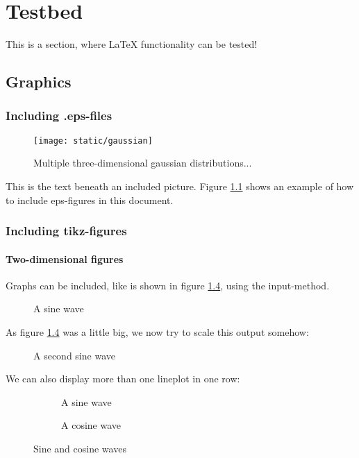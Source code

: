 \chapter[Testbed]{Testbed}
\label{chap:Testbed}
This is a section, where LaTeX functionality can be tested!
\section{Graphics}
\subsection{Including .eps-files}

\begin{figure}[H]
\centering
\texttt{[image: static/gaussian]}
\caption{Multiple three-dimensional gaussian distributions...}
\label{fig:mog}
\end{figure}


This is the text beneath an included picture. Figure \ref{fig:mog} shows an example of how to include eps-figures in this document.

\subsection{Including tikz-figures}
\subsubsection{Two-dimensional figures}
Graphs can be included, like is shown in figure \ref{fig:sin}, using the input-method.
\begin{figure}[H]
	\centering
	
	\caption{A sine wave}
	\label{fig:sin}
\end{figure}

As figure \ref{fig:sin} was a little big, we now try to scale this output somehow:

\begin{figure}[H]
	\centering
	
	\caption{A second sine wave}
	\label{fig:sin2}
\end{figure}

We can also display more than one lineplot in one row:

\begin{figure}[H]
	\centering
	\begin{subfigure}{0.49\textwidth}
		
		\caption{A sine wave}
	\end{subfigure}
	\begin{subfigure}{0.49\textwidth}
		
		\caption{A cosine wave}
	\end{subfigure}
	\caption{Sine and cosine waves}
	\label{fig:sin}
\end{figure}

